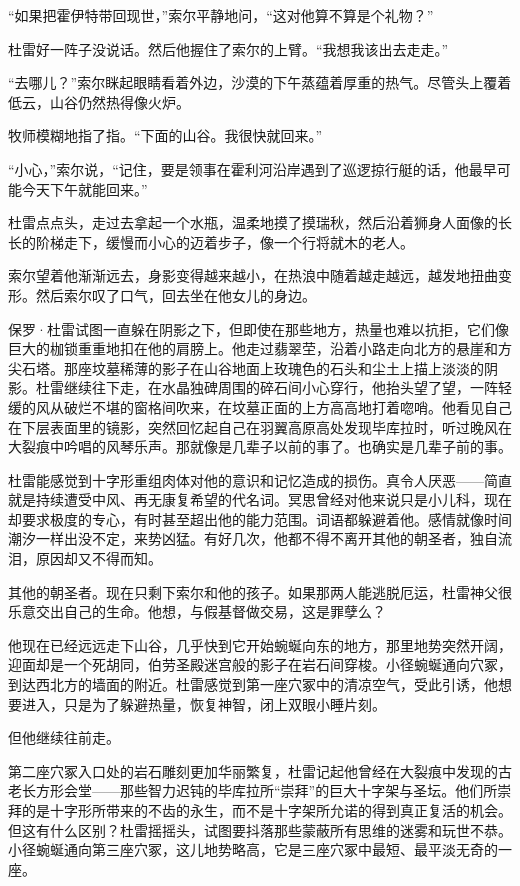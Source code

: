 \documentclass[AutoFakeBold=true]{book}
\begin{document}
``如果把霍伊特带回现世，''索尔平静地问，``这对他算不算是个礼物？''

杜雷好一阵子没说话。然后他握住了索尔的上臂。``我想我该出去走走。''

``去哪儿？''索尔眯起眼睛看着外边，沙漠的下午蒸蕴着厚重的热气。尽管头上覆着低云，山谷仍然热得像火炉。

牧师模糊地指了指。``下面的山谷。我很快就回来。''

``小心，''索尔说，``记住，要是领事在霍利河沿岸遇到了巡逻掠行艇的话，他最早可能今天下午就能回来。''

杜雷点点头，走过去拿起一个水瓶，温柔地摸了摸瑞秋，然后沿着狮身人面像的长长的阶梯走下，缓慢而小心的迈着步子，像一个行将就木的老人。

索尔望着他渐渐远去，身影变得越来越小，在热浪中随着越走越远，越发地扭曲变形。然后索尔叹了口气，回去坐在他女儿的身边。

\vspace*{1em}

保罗·杜雷试图一直躲在阴影之下，但即使在那些地方，热量也难以抗拒，它们像巨大的枷锁重重地扣在他的肩膀上。他走过翡翠茔，沿着小路走向北方的悬崖和方尖石塔。那座坟墓稀薄的影子在山谷地面上玫瑰色的石头和尘土上描上淡淡的阴影。杜雷继续往下走，在水晶独碑周围的碎石间小心穿行，他抬头望了望，一阵轻缓的风从破烂不堪的窗格间吹来，在坟墓正面的上方高高地打着唿哨。他看见自己在下层表面里的镜影，突然回忆起自己在羽翼高原高处发现毕库拉时，听过晚风在大裂痕中吟唱的风琴乐声。那就像是几辈子以前的事了。也{\kaishu 确实}是几辈子前的事。

杜雷能感觉到十字形重组肉体对他的意识和记忆造成的损伤。真令人厌恶——简直就是持续遭受中风、再无康复希望的代名词。冥思曾经对他来说只是小儿科，现在却要求极度的专心，有时甚至超出他的能力范围。词语都躲避着他。感情就像时间潮汐一样出没不定，来势凶猛。有好几次，他都不得不离开其他的朝圣者，独自流泪，原因却又不得而知。

其他的朝圣者。现在只剩下索尔和他的孩子。如果那两人能逃脱厄运，杜雷神父很乐意交出自己的生命。他想，与假基督做交易，这是罪孽么？

他现在已经远远走下山谷，几乎快到它开始蜿蜒向东的地方，那里地势突然开阔，迎面却是一个死胡同，伯劳圣殿迷宫般的影子在岩石间穿梭。小径蜿蜒通向穴冢，到达西北方的墙面的附近。杜雷感觉到第一座穴冢中的清凉空气，受此引诱，他想要进入，只是为了躲避热量，恢复神智，闭上双眼小睡片刻。

但他继续往前走。

第二座穴冢入口处的岩石雕刻更加华丽繁复，杜雷记起他曾经在大裂痕中发现的古老长方形会堂——那些智力迟钝的毕库拉所``崇拜''的巨大十字架与圣坛。他们所崇拜的是十字形所带来的不齿的永生，而不是十字架所允诺的得到真正复活的机会。{\kaishu 但这有什么区别？}杜雷摇摇头，试图要抖落那些蒙蔽所有思维的迷雾和玩世不恭。小径蜿蜒通向第三座穴冢，这儿地势略高，它是三座穴冢中最短、最平淡无奇的一座。
\end{document}
